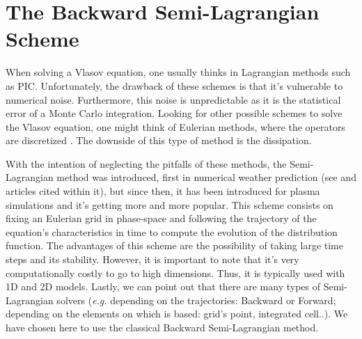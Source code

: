 \documentclass[proc]{edpsmath}
\begin{document}


\section{The Backward Semi-Lagrangian Scheme}
\label{sec:BSL_scheme}

When solving a Vlasov equation, one usually thinks in Lagrangian methods such as PIC\cite{Birdsall:1985:PPV:577251}. Unfortunately, the drawback of these schemes is that it's vulnerable to numerical noise. Furthermore, this noise is unpredictable as it is the statistical error of a Monte Carlo integration. Looking for other possible schemes to solve the Vlasov equation, one might think of Eulerian methods, where the operators 
are discretized \cite{Zaki1988184}. The downside of this type of method is the dissipation.

With the intention of neglecting the pitfalls of these methods, the Semi-Lagrangian method was introduced, first in numerical weather prediction (see \cite{Kalnay03atmosphericmodeling} and articles cited within it), but since then, it has been introduced for plasma simulations \cite{Sonnendrucker1999201, Cheng1976330} and it's getting more and more popular. 
This scheme consists on fixing an Eulerian grid in phase-space and following the trajectory of the equation's characteristics in time to compute the evolution of the distribution function. The advantages of this scheme are the possibility of taking large time steps and its stability. However, it is important to note that it's very computationally costly to go to high dimensions. Thus, it is typically used with 1D and 2D models. Lastly, we can point out that there are many types of Semi-Lagrangian solvers (\emph{e.g.} depending on the trajectories: Backward or Forward;  depending on the elements on which is based: grid's point, integrated cell..). We have chosen here to use the classical Backward Semi-Lagrangian method. 
\end{document}

